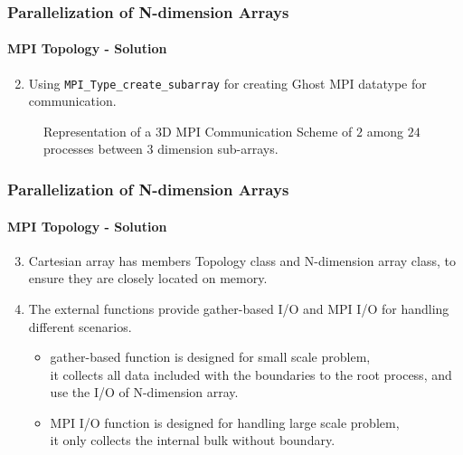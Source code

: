 \begin{frame}
  \frametitle{Parallelization of N-dimension Arrays}
  \framesubtitle{MPI Topology - Solution}
  \begin{enumerate}
    \setcounter{enumi}{1}
    \item Using \texttt{MPI\_Type\_create\_subarray} for creating Ghost MPI datatype for communication.
  \end{enumerate}

  \begin{figure}[htbp]
    \centering
    \caption{
      Representation of a 3D MPI Communication Scheme of $2$ among $24$ processes between $3$ dimension sub-arrays.
    }
    \label{FIG_MPI_3D_exchange_SCHEME}
  \end{figure}


\end{frame}





\begin{frame}
  \frametitle{Parallelization of N-dimension Arrays}
  \framesubtitle{MPI Topology - Solution}
  \begin{enumerate}
    \setcounter{enumi}{2}
    \item Cartesian array has members Topology class and N-dimension array class, to ensure they are closely located on memory.
    \item The external functions provide gather-based I/O and MPI I/O for handling different scenarios.
    \begin{itemize}
      \item gather-based function is designed for small scale problem, \\it collects all data included with the boundaries to the root process, and use the I/O of N-dimension array.
      \item MPI I/O function is designed for handling large scale problem, \\it only collects the internal bulk without boundary.
    \end{itemize}
  \end{enumerate}
\end{frame}






